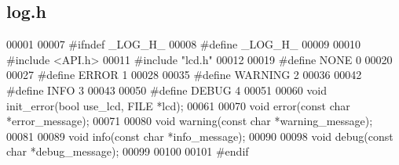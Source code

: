 \subsection{log.\+h}
\label{log_8h_source}

\begin{DoxyCode}
00001 
00007 \textcolor{preprocessor}{#ifndef \_LOG\_H\_}
00008 \textcolor{preprocessor}{#define \_LOG\_H\_}
00009 
00010 \textcolor{preprocessor}{#include <API.h>}
00011 \textcolor{preprocessor}{#include "lcd.h"}
00012 
00019 \textcolor{preprocessor}{#define NONE 0}
00020 
00027 \textcolor{preprocessor}{#define ERROR 1}
00028 
00035 \textcolor{preprocessor}{#define WARNING 2}
00036 
00042 \textcolor{preprocessor}{#define INFO 3}
00043 
00050 \textcolor{preprocessor}{#define DEBUG 4}
00051 
00060 \textcolor{keywordtype}{void} init_error(\textcolor{keywordtype}{bool} use\_lcd, FILE *lcd);
00061 
00070 \textcolor{keywordtype}{void} error(\textcolor{keyword}{const} \textcolor{keywordtype}{char} *error\_message);
00071 
00080 \textcolor{keywordtype}{void} warning(\textcolor{keyword}{const} \textcolor{keywordtype}{char} *warning\_message);
00081 
00089 \textcolor{keywordtype}{void} info(\textcolor{keyword}{const} \textcolor{keywordtype}{char} *info\_message);
00090 
00098 \textcolor{keywordtype}{void} debug(\textcolor{keyword}{const} \textcolor{keywordtype}{char} *debug\_message);
00099 
00100 
00101 \textcolor{preprocessor}{#endif}
\end{DoxyCode}
